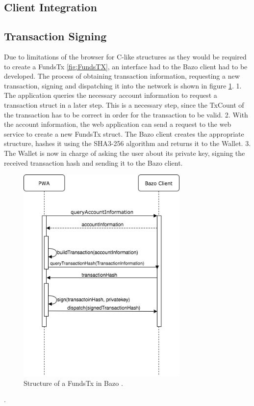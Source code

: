 \subsection{Client Integration}
\subsection{Transaction Signing}
Due to limitations of the browser for C-like structures as they would be required to create a FundsTx \ref{fig:FundsTX}, an interface had to the Bazo client had to be developed. 
The process of obtaining transaction information, requesting a new transaction, signing and dispatching it into the network is shown in figure \ref{fig:TransactionProcess}.
1. The application queries the necessary account information to request a transaction struct in a later step. This is a necessary step, since the TxCount of the transaction has to be correct in order for the transaction to be valid.
2. With the account information, the web application can send a request to the web service to create a new FundsTx struct. The Bazo client creates the appropriate structure, hashes it using the SHA3-256 algorithm and returns it to the Wallet.
3. The Wallet is now in charge of asking the user about its private key, signing the received transaction hash and sending it to the Bazo client.
\begin{figure}
\centering
\includegraphics[width=0.75\textwidth]{diagrams/transactionProcess.png}
\caption{\label{fig:TransactionProcess}Structure of a FundsTx in Bazo \cite{lisg}.}
\end{figure}.

